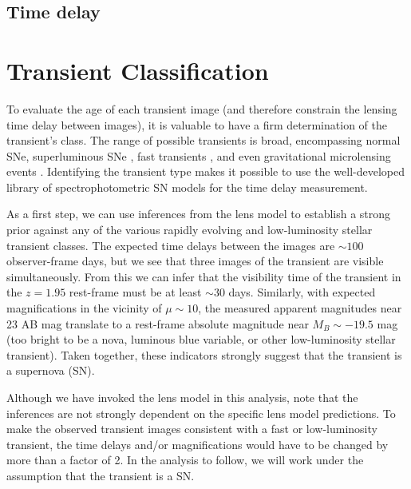 \documentclass[twocolumn]{aastex63}
\begin{document}
\subsection{Time delay}
\label{ss:timedelay}

\section{Transient Classification}
\label{s:classifiation}


To evaluate the age of each transient image (and therefore constrain the lensing time delay between images), it is valuable to have a firm determination of the transient's class.  The range of possible transients is broad, encompassing normal SNe, superluminous SNe \citep{galyam_luminous_2019}, fast transients \citep{berger_fast_2013, drout_rapidly_2014}, and even gravitational microlensing events \citep{rodney_two_2018,kelly_extreme_2018}.  Identifying the transient type makes it possible to use the well-developed library of spectrophotometric SN models \citep[e.g.][]{kessler_models_2019} for the time delay measurement. 
 
 


As a first step, we can use inferences from the lens model to establish a strong prior against any of the various rapidly evolving and low-luminosity stellar transient classes.  
The expected time delays between the images are $\sim100$ observer-frame days, 
but we see that three images of the transient are visible simultaneously.
From this we can infer that the visibility time of the transient in the $z=1.95$ rest-frame must be at least $\sim$30 days. 
Similarly, with expected magnifications in the vicinity of $\mu\sim10$, the measured apparent magnitudes near 23 AB mag translate to a rest-frame absolute magnitude near $M_B \sim-19.5$ mag (too bright to be a nova, luminous blue variable, or other low-luminosity stellar transient).
Taken together, these indicators strongly suggest that the transient is a supernova (SN). 

Although we have invoked the lens model in this analysis, note that the inferences are not strongly dependent on the specific lens model predictions.  To make the observed transient images consistent with a fast or low-luminosity transient, the time delays and/or magnifications would have to be changed by more than a factor of 2.  In the analysis to follow, we will work under the assumption that the transient is a SN. 
\end{document}
